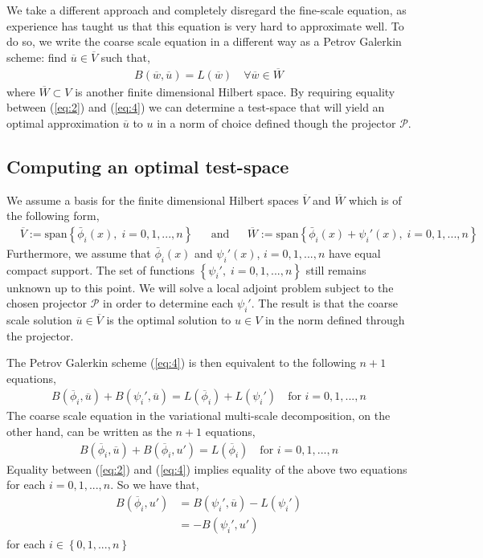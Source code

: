 We take a different approach and completely disregard the fine-scale equation, as experience has taught us that this equation is very hard to approximate well. To do so, we write the coarse scale equation in a different way as a Petrov Galerkin scheme: find $\overline{u} \in \overline{V}$ such that,
\begin{align}
	B(\overline{w}, \overline{u}) = L(\overline{w})	\quad \forall \overline{w} \in \overline{W} \label{eq:4}
\end{align}
where $\overline{W} \subset V$ is another finite dimensional Hilbert space. By requiring equality between (\ref{eq:2}) and (\ref{eq:4}) we can determine a test-space that will yield an optimal approximation $\overline{u}$ to $u$ in a norm of choice defined though the projector $\mathcal{P}$.

\subsection{Computing an optimal test-space}
We assume a basis for the finite dimensional Hilbert spaces $\overline{V}$ and $\overline{W}$ which is of the following form,
\begin{align}
	& \overline{V} := \mathrm{span} \left\{ \bar{\phi}_i(x), \; i=0,1,...,n   \right\} & &\text{and} &
	& \overline{W} := \mathrm{span} \left\{ \bar{\phi}_i(x) +  \psi_i'(x), \; i=0,1,...,n   \right\} &
\end{align}
Furthermore, we assume that $\bar{\phi}_i(x)$ and $\psi_i'(x)$, $i=0,1,...,n$ have equal compact support. The set of functions $\left\{ \psi_i', \; i=0,1,...,n  \right\}$ still remains unknown up to this point.  We will solve a local adjoint problem subject to the chosen projector $\mathcal{P}$ in order to determine each $\psi_i'$. The result is that the coarse scale solution $\overline{u} \in \overline{V}$ is the optimal solution to $u \in V$ in the norm defined through the projector.

The Petrov Galerkin scheme (\ref{eq:4}) is then equivalent to the following $n+1$ equations,
\begin{align}
	B(\overline{\phi}_i, \overline{u}) + B(\psi_i', \overline{u}) = L(\overline{\phi}_i) + L(\psi_i') 	\quad \text{for } i=0,1,...,n 
\end{align}
The coarse scale equation in the variational multi-scale decomposition, on the other hand, can be written as the $n+1$ equations,
\begin{align}
	B(\overline{\phi}_i, \overline{u}) + B(\overline{\phi}_i, u') = L(\overline{\phi}_i)  	\quad \text{for } i=0,1,...,n 
\end{align}
Equality between (\ref{eq:2}) and (\ref{eq:4}) implies equality of the above two equations for each $i=0,1,...,n$. So we have that,
\begin{align*}
	B(\overline{\phi}_i, u') &= B(\psi_i', \overline{u}) - L(\psi_i') \\
					 &= - B(\psi_i', u') 
\end{align*}
for each $i \in \left\{0,1,...,n\right\}$

